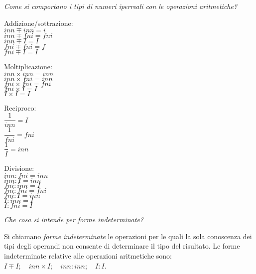 \begin{esercizio}\label{ese:iper_016} 
\emph{Come si comportano i tipi di numeri iperreali con le operazioni 
aritmetiche?}

\noindent\begin{minipage}{.30\textwidth}
 Addizione/sottrazione:\\
\(inn \mp inn = i\)\\
\(inn \mp fni = fni\)\\
\(inn \mp I = I\)\\
\(fni \mp fni = f\)\\
\(fni \mp I = I\)
\vspace{24pt}
\end{minipage}
\noindent\begin{minipage}{.25\textwidth}
 Moltiplicazione:\\
\(inn \times inn = inn\)\\
\(inn \times fni = inn\)\\
\(fni \times fni = fni\)\\
\(fni \times I = I\)\\
\(I \times I = I\)
\vspace{24pt}
\end{minipage}
\noindent\begin{minipage}{.15\textwidth}
 Reciproco:\\
\(\dfrac{1}{inn} = I\)\\
\(\dfrac{1}{fni} = fni\)\\
\(\dfrac{1}{I} = inn\)\\
\vspace{12pt}
\end{minipage}
\noindent\begin{minipage}{.25\textwidth}
 Divisione:\\
\(inn : fni = inn\)\\
\(inn : I = inn\)\\
\(fni : inn = I\)\\
\(fni : fni = fni\)\\
\(fni : I = inn\)\\
\(I : inn = I\)\\
\(I : fni = I\)
\end{minipage}
\end{esercizio}

\begin{esercizio}\label{ese:iper_017} 
\emph{Che cosa si intende per \emph{forme indeterminate}?}

Si chiamano \emph{forme indeterminate} le operazioni per le quali la sola 
conoscenza dei tipi degli operandi non consente di determinare il tipo del 
risultato. 
Le forme indeterminate relative alle operazioni aritmetiche sono:
\(I \mp I; \quad inn \times I; \quad inn : inn; \quad I : I\).
\end{esercizio}

